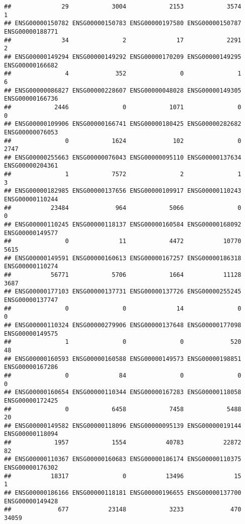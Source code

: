 \documentclass[
]{article}
\begin{document}
\begin{verbatim}
##              29            3004            2153            3574               1 
## ENSG00000150782 ENSG00000150783 ENSG00000197580 ENSG00000150787 ENSG00000188771 
##              34               2              17            2291               2 
## ENSG00000149294 ENSG00000149292 ENSG00000170209 ENSG00000149295 ENSG00000166682 
##               4             352               0               1               6 
## ENSG00000086827 ENSG00000228607 ENSG00000048028 ENSG00000149305 ENSG00000166736 
##            2446               0            1071               0               0 
## ENSG00000109906 ENSG00000166741 ENSG00000180425 ENSG00000282682 ENSG00000076053 
##               0            1624             102               0            2747 
## ENSG00000255663 ENSG00000076043 ENSG00000095110 ENSG00000137634 ENSG00000204361 
##               1            7572               2               1               3 
## ENSG00000182985 ENSG00000137656 ENSG00000109917 ENSG00000110243 ENSG00000110244 
##           23484             964            5066               0               0 
## ENSG00000110245 ENSG00000118137 ENSG00000160584 ENSG00000168092 ENSG00000149577 
##               0              11            4472           10770            5615 
## ENSG00000149591 ENSG00000160613 ENSG00000167257 ENSG00000186318 ENSG00000110274 
##           56771            5706            1664           11128            3687 
## ENSG00000177103 ENSG00000137731 ENSG00000137726 ENSG00000255245 ENSG00000137747 
##               0               0              14               0               0 
## ENSG00000110324 ENSG00000279906 ENSG00000137648 ENSG00000177098 ENSG00000149575 
##               1               0               0             520              48 
## ENSG00000160593 ENSG00000160588 ENSG00000149573 ENSG00000198851 ENSG00000167286 
##               0              84               0               0               0 
## ENSG00000160654 ENSG00000110344 ENSG00000167283 ENSG00000118058 ENSG00000172425 
##               0            6458            7458            5488              20 
## ENSG00000149582 ENSG00000118096 ENSG00000095139 ENSG00000019144 ENSG00000118094 
##            1957            1554           40783           22872              82 
## ENSG00000110367 ENSG00000160683 ENSG00000186174 ENSG00000110375 ENSG00000176302 
##           18317               0           13496              15               1 
## ENSG00000186166 ENSG00000118181 ENSG00000196655 ENSG00000137700 ENSG00000149428 
##             677           23148            3233             470           34059 

\end{verbatim}
\end{document}
